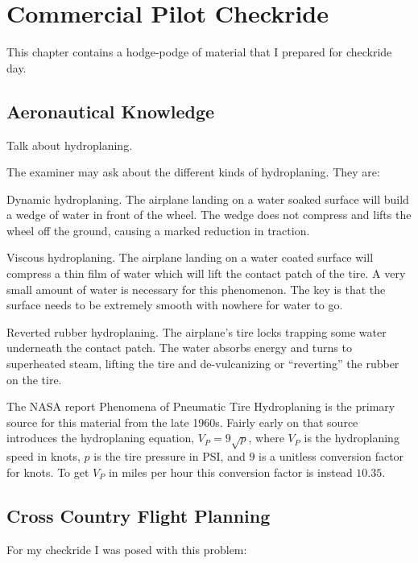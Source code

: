 \chapter{Commercial Pilot Checkride}

This chapter contains a hodge-podge of material that I prepared for checkride day.

\section{Aeronautical Knowledge}

Talk about hydroplaning.

The examiner may ask about the different kinds of hydroplaning. They are:

Dynamic hydroplaning. The airplane landing on a water soaked surface will build a wedge of water in front of the wheel. The wedge does not compress and lifts the wheel off the ground, causing a marked reduction in traction.

Viscous hydroplaning. The airplane landing on a water coated surface will compress a thin film of water which will lift the contact patch of the tire. A very small amount of water is necessary for this phenomenon. The key is that the surface needs to be extremely smooth with nowhere for water to go.

Reverted rubber hydroplaning. The airplane's tire locks trapping some water underneath the contact patch. The water absorbs energy and turns to superheated steam, lifting the tire and de-vulcanizing or ``reverting'' the rubber on the tire.

The NASA report Phenomena of Pneumatic Tire Hydroplaning \cite{hydroplaning} is the primary source for this material from the late 1960s. Fairly early on that source introduces the hydroplaning equation, $V_P = 9 \sqrt{p}$, where $V_P$ is the hydroplaning speed in knots, $p$ is the tire pressure in PSI, and $9$ is a unitless conversion factor for knots. To get $V_P$ in miles per hour this conversion factor is instead $10.35$.

\section{Cross Country Flight Planning}

For my checkride I was posed with this problem:

